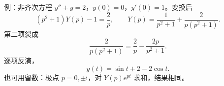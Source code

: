 \documentclass[fontset=windows, chinese, 10pt, xcolor=dvipsnames]{beamer}
\begin{document}
\begin{frame}{例：非齐次方程}
  $y''+y=2$，$y(0)=0$，$y'(0)=1$。变换后
  \begin{equation*}
    (p^2+1)Y(p)-1=\frac{2}{p},
    \qquad
    Y(p)=\frac{1}{p^2+1}+\frac{2}{p(p^2+1)}.
  \end{equation*}
  第二项裂成
  \begin{equation*}
    \frac{2}{p(p^2+1)}=\frac{2}{p}-\frac{2p}{p^2+1}.
  \end{equation*}
  逐项反演，
  \begin{equation*}
    y(t)=\sin t+2-2\cos t.
  \end{equation*}
  也可用留数：极点 $p=0,\pm\mathrm{i}$，对 $Y(p)e^{pt}$ 求和，结果相同。
\end{frame}


\end{document}
